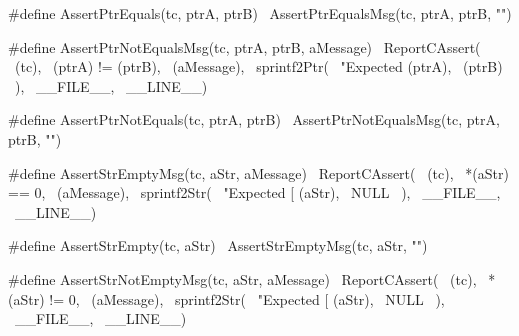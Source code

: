 {#define AssertPtrEquals(tc, ptrA, ptrB) \
  AssertPtrEqualsMsg(tc, ptrA, ptrB, "")
\stopCHeader

\stopTestSuite

\startTestSuite[assertPtrNotEquals]

\startCHeader
#define AssertPtrNotEqualsMsg(tc, ptrA, ptrB, aMessage) \
  ReportCAssert(                                        \
    (tc),                                               \
    (ptrA) != (ptrB),                                   \
    (aMessage),                                         \
    sprintf2Ptr(                                        \
      "Expected %
      (ptrA),                                           \
      (ptrB)                                            \
    ),                                                  \
    __FILE__,                                           \
    __LINE__)

#define AssertPtrNotEquals(tc, ptrA, ptrB) \
  AssertPtrNotEqualsMsg(tc, ptrA, ptrB, "")
\stopCHeader

\stopTestSuite

\startTestSuite[assertStrEmpty]

\startCHeader
#define AssertStrEmptyMsg(tc, aStr, aMessage) \
  ReportCAssert(                              \
    (tc),                                     \
    *(aStr) == 0,                             \
    (aMessage),                               \
    sprintf2Str(                              \
      "Expected [%
      (aStr),                                 \
      NULL                                    \
    ),                                        \
    __FILE__,                                 \
    __LINE__)

#define AssertStrEmpty(tc, aStr) \
  AssertStrEmptyMsg(tc, aStr, "")
\stopCHeader

\stopTestSuite

\startTestSuite[assertStrNotEmpty]

\startCHeader
#define AssertStrNotEmptyMsg(tc, aStr, aMessage) \
  ReportCAssert(                                 \
    (tc),                                        \
    *(aStr) != 0,                                \
    (aMessage),                                  \
    sprintf2Str(                                 \
      "Expected [%
      (aStr),                                    \
      NULL                                       \
    ),                                           \
    __FILE__,                                    \
    __LINE__)

}
